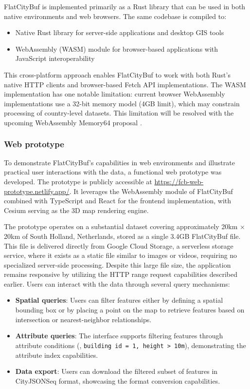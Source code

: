 FlatCityBuf is implemented primarily as a Rust library that can be used in both native environments and web browsers. The same codebase is compiled to:

\begin{itemize}
  \item Native Rust library for server-side applications and desktop GIS tools
  \item WebAssembly (WASM) module for browser-based applications with JavaScript interoperability
\end{itemize}

This cross-platform approach enables FlatCityBuf to work with both Rust's native HTTP clients and browser-based Fetch API implementations. The WASM implementation has one notable limitation: current browser WebAssembly implementations use a 32-bit memory model (4GB limit), which may constrain processing of country-level datasets. This limitation will be resolved with the upcoming WebAssembly Memory64 proposal \citep{WebAssemblyCoreSpecification2}.
\subsubsection{Web prototype}
\label{methodology:http_range_requests:cross_platform_implementation:web_prototype}

To demonstrate FlatCityBuf's capabilities in web environments and illustrate practical user interactions with the data, a functional web prototype was developed. The prototype is publicly accessible at \url{https://fcb-web-prototype.netlify.app/}. It leverages the WebAssembly module of FlatCityBuf combined with TypeScript and React for the frontend implementation, with Cesium serving as the 3D map rendering engine.

The prototype operates on a substantial dataset covering approximately 20km $\times$ 20km of South Holland, Netherlands, stored as a single 3.4GB FlatCityBuf file. This file is delivered directly from Google Cloud Storage\citep{gcs}, a serverless storage service, where it exists as a static file similar to images or videos, requiring no specialized server-side processing. Despite this large file size, the application remains responsive by utilizing the HTTP range request capabilities described earlier. Users can interact with the data through several query mechanisms:

\begin{itemize}
  \item \textbf{Spatial queries}: Users can filter features either by defining a spatial bounding box or by placing a point on the map to retrieve features based on intersection or nearest-neighbor relationships.

  \item \textbf{Attribute queries}: The interface supports filtering features through attribute conditions (\eg, \texttt{building id = 1, height > 10m}), demonstrating the attribute index capabilities.

  \item \textbf{Data export}: Users can download the filtered subset of features in CityJSONSeq format, showcasing the format conversion capabilities.
\end{itemize}

